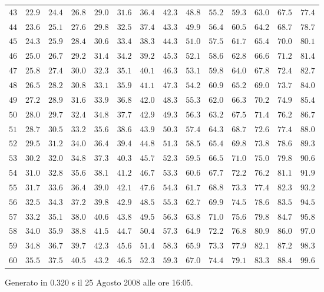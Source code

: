 \begin{table}[htb!]
\begin{center}
{\begin{tabular}{p{22 pt}ccccccccccccc}
$43$ & $22.9$ & $24.4$ & $26.8$ & $29.0$ & $31.6$ & $36.4$ & $42.3$ & $48.8$ & $55.2$ & $59.3$ & $63.0$ & $67.5$ & $77.4$\\
$44$ & $23.6$ & $25.1$ & $27.6$ & $29.8$ & $32.5$ & $37.4$ & $43.3$ & $49.9$ & $56.4$ & $60.5$ & $64.2$ & $68.7$ & $78.7$\\
$45$ & $24.3$ & $25.9$ & $28.4$ & $30.6$ & $33.4$ & $38.3$ & $44.3$ & $51.0$ & $57.5$ & $61.7$ & $65.4$ & $70.0$ & $80.1$\\
$46$ & $25.0$ & $26.7$ & $29.2$ & $31.4$ & $34.2$ & $39.2$ & $45.3$ & $52.1$ & $58.6$ & $62.8$ & $66.6$ & $71.2$ & $81.4$\\
$47$ & $25.8$ & $27.4$ & $30.0$ & $32.3$ & $35.1$ & $40.1$ & $46.3$ & $53.1$ & $59.8$ & $64.0$ & $67.8$ & $72.4$ & $82.7$\\
$48$ & $26.5$ & $28.2$ & $30.8$ & $33.1$ & $35.9$ & $41.1$ & $47.3$ & $54.2$ & $60.9$ & $65.2$ & $69.0$ & $73.7$ & $84.0$\\
$49$ & $27.2$ & $28.9$ & $31.6$ & $33.9$ & $36.8$ & $42.0$ & $48.3$ & $55.3$ & $62.0$ & $66.3$ & $70.2$ & $74.9$ & $85.4$\\
$50$ & $28.0$ & $29.7$ & $32.4$ & $34.8$ & $37.7$ & $42.9$ & $49.3$ & $56.3$ & $63.2$ & $67.5$ & $71.4$ & $76.2$ & $86.7$\\
$51$ & $28.7$ & $30.5$ & $33.2$ & $35.6$ & $38.6$ & $43.9$ & $50.3$ & $57.4$ & $64.3$ & $68.7$ & $72.6$ & $77.4$ & $88.0$\\
$52$ & $29.5$ & $31.2$ & $34.0$ & $36.4$ & $39.4$ & $44.8$ & $51.3$ & $58.5$ & $65.4$ & $69.8$ & $73.8$ & $78.6$ & $89.3$\\
$53$ & $30.2$ & $32.0$ & $34.8$ & $37.3$ & $40.3$ & $45.7$ & $52.3$ & $59.5$ & $66.5$ & $71.0$ & $75.0$ & $79.8$ & $90.6$\\
$54$ & $31.0$ & $32.8$ & $35.6$ & $38.1$ & $41.2$ & $46.7$ & $53.3$ & $60.6$ & $67.7$ & $72.2$ & $76.2$ & $81.1$ & $91.9$\\
$55$ & $31.7$ & $33.6$ & $36.4$ & $39.0$ & $42.1$ & $47.6$ & $54.3$ & $61.7$ & $68.8$ & $73.3$ & $77.4$ & $82.3$ & $93.2$\\
$56$ & $32.5$ & $34.3$ & $37.2$ & $39.8$ & $42.9$ & $48.5$ & $55.3$ & $62.7$ & $69.9$ & $74.5$ & $78.6$ & $83.5$ & $94.5$\\
$57$ & $33.2$ & $35.1$ & $38.0$ & $40.6$ & $43.8$ & $49.5$ & $56.3$ & $63.8$ & $71.0$ & $75.6$ & $79.8$ & $84.7$ & $95.8$\\
$58$ & $34.0$ & $35.9$ & $38.8$ & $41.5$ & $44.7$ & $50.4$ & $57.3$ & $64.9$ & $72.2$ & $76.8$ & $80.9$ & $86.0$ & $97.0$\\
$59$ & $34.8$ & $36.7$ & $39.7$ & $42.3$ & $45.6$ & $51.4$ & $58.3$ & $65.9$ & $73.3$ & $77.9$ & $82.1$ & $87.2$ & $98.3$\\
$60$ & $35.5$ & $37.5$ & $40.5$ & $43.2$ & $46.5$ & $52.3$ & $59.3$ & $67.0$ & $74.4$ & $79.1$ & $83.3$ & $88.4$ & $99.6$\\
\hline

\end{tabular}
}
\end{center}
\end{table}
\vfill
\hfill {\scriptsize Generato in 0.320 s il 25 Agosto 2008 alle ore 16:05.}
